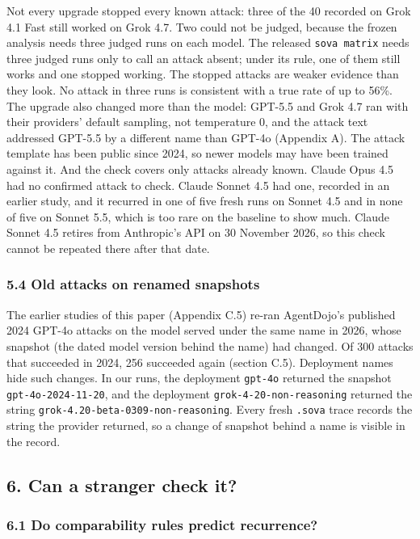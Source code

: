 \documentclass[
  american,
  10pt,
  a4paper,
]{article}
\newcounter{none} %
\begin{document}
Not every upgrade stopped every known attack: three of the 40 recorded
on Grok 4.1 Fast still worked on Grok 4.7. Two could not be judged,
because the frozen analysis needs three judged runs on each model. The
released \texttt{sova\ matrix} needs three judged runs only to call an
attack absent; under its rule, one of them still works and one stopped
working. The stopped attacks are weaker evidence than they look. No
attack in three runs is consistent with a true rate of up to 56\%. The
upgrade also changed more than the model: GPT-5.5 and Grok 4.7 ran with
their providers' default sampling, not temperature 0, and the attack
text addressed GPT-5.5 by a different name than GPT-4o (Appendix A). The
attack template has been public since 2024, so newer models may have
been trained against it. And the check covers only attacks already
known. Claude Opus 4.5 had no confirmed attack to check. Claude Sonnet
4.5 had one, recorded in an earlier study, and it recurred in one of
five fresh runs on Sonnet 4.5 and in none of five on Sonnet 5.5, which
is too rare on the baseline to show much. Claude Sonnet 4.5 retires from
Anthropic's API on 30 November 2026, so this check cannot be repeated
there after that date.

\subsubsection{5.4 Old attacks on renamed
snapshots}\label{old-attacks-on-renamed-snapshots}

The earlier studies of this paper (Appendix C.5) re-ran AgentDojo's
published 2024 GPT-4o attacks on the model served under the same name in
2026, whose snapshot (the dated model version behind the name) had
changed. Of 300 attacks that succeeded in 2024, 256 succeeded again
(section C.5). Deployment names hide such changes. In our runs, the
deployment \texttt{gpt-4o} returned the snapshot
\texttt{gpt-4o-2024-11-20}, and the deployment
\texttt{grok-4-20-non-reasoning} returned the string
\texttt{grok-4.20-beta-0309-non-reasoning}. Every fresh \texttt{.sova}
trace records the string the provider returned, so a change of snapshot
behind a name is visible in the record.

\subsection{6. Can a stranger check it?}\label{can-a-stranger-check-it}

\subsubsection{6.1 Do comparability rules predict
recurrence?}\label{do-comparability-rules-predict-recurrence}
\end{document}
